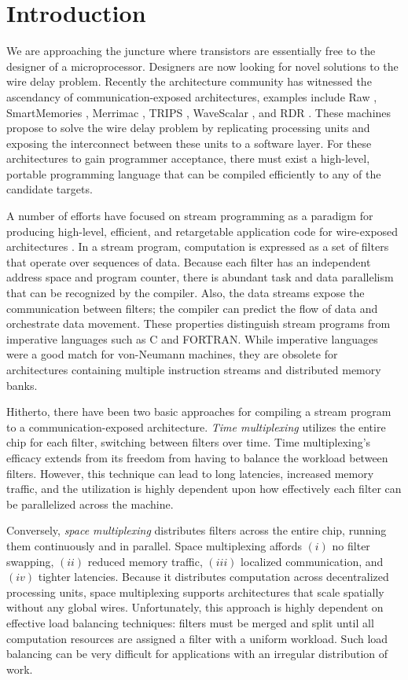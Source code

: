 \section{Introduction}

We are approaching the juncture where transistors are essentially free
to the designer of a microprocessor.  Designers are now looking for
novel solutions to the wire delay problem. Recently the architecture
community has witnessed the ascendancy of communication-exposed
architectures, examples include Raw \cite{raw}, SmartMemories
\cite{smartmemories}, Merrimac \cite{merrimac-sc03}, TRIPS
\cite{trips}, WaveScalar \cite{wavescalar}, and RDR \cite{rdr}.  These
machines propose to solve the wire delay problem by replicating
processing units and exposing the interconnect between these units to
a software layer.  For these architectures to gain programmer
acceptance, there must exist a high-level, portable programming
language that can be compiled efficiently to any of the candidate
targets.

A number of efforts have focused on stream programming as a paradigm
for producing high-level, efficient, and retargetable application code
for wire-exposed architectures \cite{streamit-asplos,imagine-ieee,merrimac-sc03,trips-isca03}.
In a stream program, computation is expressed as a set of filters that
operate over sequences of data.  Because each filter has an
independent address space and program counter, there is abundant task
and data parallelism that can be recognized by the compiler.  Also,
the data streams expose the communication between filters; the
compiler can predict the flow of data and orchestrate data movement.
These properties distinguish stream programs from imperative languages
such as C and FORTRAN.  While imperative languages were a good match
for von-Neumann machines, they are obsolete for architectures
containing multiple instruction streams and distributed memory banks.

Hitherto, there have been two basic approaches for compiling a stream
program to a communication-exposed architecture.  {\it Time
multiplexing} utilizes the entire chip for each filter, switching
between filters over time.  Time multiplexing's efficacy extends from
its freedom from having to balance the workload between filters.
However, this technique can lead to long latencies, increased memory
traffic, and the utilization is highly dependent upon how effectively
each filter can be parallelized across the machine.

Conversely, {\it space multiplexing} distributes filters across the
entire chip, running them continuously and in parallel.  Space
multiplexing affords $(i)$ no filter swapping, $(ii)$ reduced memory
traffic, $(iii)$ localized communication, and $(iv)$ tighter
latencies.  Because it distributes computation across decentralized
processing units, space multiplexing supports architectures that scale
spatially without any global wires.  Unfortunately, this approach is
highly dependent on effective load balancing techniques: filters must
be merged and split until all computation resources are assigned a
filter with a uniform workload.  Such load balancing can be very
difficult for applications with an irregular distribution of work.

